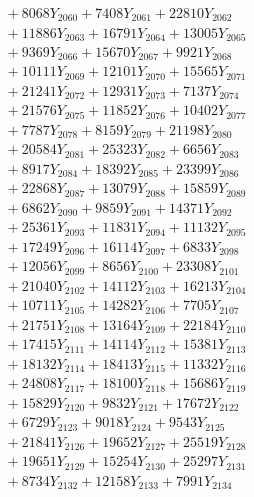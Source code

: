 \documentclass[a4paper,10pt]{article}
\begin{document}
{\begin{align}
&\;  + 8068 Y_{2060} + 7408 Y_{2061} + 22810 Y_{2062} \\[0.3ex]
&\;  + 11886 Y_{2063} + 16791 Y_{2064} + 13005 Y_{2065} \\[0.3ex]
&\;  + 9369 Y_{2066} + 15670 Y_{2067} + 9921 Y_{2068} \\[0.5ex]\allowbreak
&\;  + 10111 Y_{2069} + 12101 Y_{2070} + 15565 Y_{2071} \\[0.3ex]
&\;  + 21241 Y_{2072} + 12931 Y_{2073} + 7137 Y_{2074} \\[0.3ex]
&\;  + 21576 Y_{2075} + 11852 Y_{2076} + 10402 Y_{2077} \\[0.3ex]
&\;  + 7787 Y_{2078} + 8159 Y_{2079} + 21198 Y_{2080} \\[0.3ex]
&\;  + 20584 Y_{2081} + 25323 Y_{2082} + 6656 Y_{2083} \\[0.3ex]
&\;  + 8917 Y_{2084} + 18392 Y_{2085} + 23399 Y_{2086} \\[0.3ex]
&\;  + 22868 Y_{2087} + 13079 Y_{2088} + 15859 Y_{2089} \\[0.3ex]
&\;  + 6862 Y_{2090} + 9859 Y_{2091} + 14371 Y_{2092} \\[0.3ex]
&\;  + 25361 Y_{2093} + 11831 Y_{2094} + 11132 Y_{2095} \\[0.3ex]
&\;  + 17249 Y_{2096} + 16114 Y_{2097} + 6833 Y_{2098} \\[0.5ex]\allowbreak
&\;  + 12056 Y_{2099} + 8656 Y_{2100} + 23308 Y_{2101} \\[0.3ex]
&\;  + 21040 Y_{2102} + 14112 Y_{2103} + 16213 Y_{2104} \\[0.3ex]
&\;  + 10711 Y_{2105} + 14282 Y_{2106} + 7705 Y_{2107} \\[0.3ex]
&\;  + 21751 Y_{2108} + 13164 Y_{2109} + 22184 Y_{2110} \\[0.3ex]
&\;  + 17415 Y_{2111} + 14114 Y_{2112} + 15381 Y_{2113} \\[0.3ex]
&\;  + 18132 Y_{2114} + 18413 Y_{2115} + 11332 Y_{2116} \\[0.3ex]
&\;  + 24808 Y_{2117} + 18100 Y_{2118} + 15686 Y_{2119} \\[0.3ex]
&\;  + 15829 Y_{2120} + 9832 Y_{2121} + 17672 Y_{2122} \\[0.3ex]
&\;  + 6729 Y_{2123} + 9018 Y_{2124} + 9543 Y_{2125} \\[0.3ex]
&\;  + 21841 Y_{2126} + 19652 Y_{2127} + 25519 Y_{2128} \\[0.5ex]\allowbreak
&\;  + 19651 Y_{2129} + 15254 Y_{2130} + 25297 Y_{2131} \\[0.3ex]
&\;  + 8734 Y_{2132} + 12158 Y_{2133} + 7991 Y_{2134} \\[0.3ex]

\end{align}}
\end{document}
